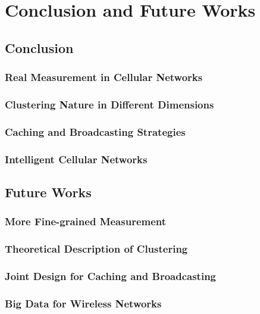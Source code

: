 
\chapter{Conclusion and Future Works} %
\minitoc
\label{Chapter7} %


\section{Conclusion}
\subsection{Real Measurement in Cellular Networks}
\subsection{Clustering Nature in Different Dimensions}
\subsection{Caching and Broadcasting Strategies}
\subsection{Intelligent Cellular Networks}
\section{Future Works}
\subsection{More Fine-grained Measurement}
\subsection{Theoretical Description of Clustering}
\subsection{Joint Design for Caching and Broadcasting}
\subsection{Big Data for Wireless Networks}
